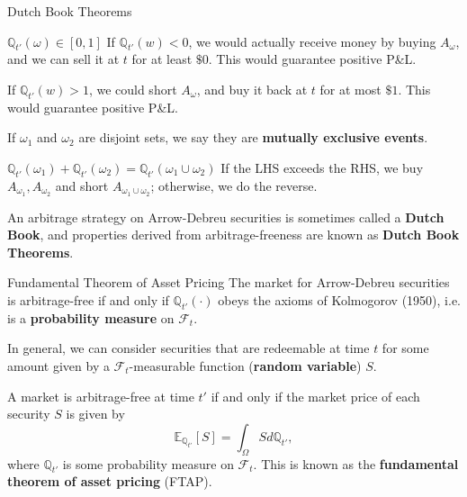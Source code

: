\documentclass{beamer}
\begin{document}
\begin{frame}{Dutch Book Theorems}
	\begin{block}{$\mathbb{Q}_{t'}(\omega) \in [0,1]$}
		If $\mathbb{Q}_{t'}(w)<0$, we would actually receive money by buying $A_\omega$, and we can sell it at $t$ for at least $\$0$. This would guarantee positive P\&L.

		If $\mathbb{Q}_{t'}(w)>1$, we could short $A_\omega$, and buy it back at $t$ for at most $\$1$. This would guarantee positive P\&L.
	\end{block}

	If $\omega_1$ and $\omega_2$ are disjoint sets, we say they are \textbf{mutually exclusive events}.
	\begin{block}{$\mathbb{Q}_{t'}(\omega_1) + \mathbb{Q}_{t'}(\omega_2) = \mathbb{Q}_{t'}(\omega_1 \cup \omega_2)$}
		If the LHS exceeds the RHS, we buy $A_{\omega_1},A_{\omega_2}$ and short $A_{\omega_1\cup\omega_2}$; otherwise, we do the reverse.
	\end{block}

	An arbitrage strategy on Arrow-Debreu securities is sometimes called a \textbf{Dutch Book}, and properties derived from arbitrage-freeness are known as \textbf{Dutch Book Theorems}.

\end{frame}

\begin{frame}{Fundamental Theorem of Asset Pricing}
	The market for Arrow-Debreu securities is arbitrage-free if and only if $\mathbb{Q}_{t'}(\cdot)$ obeys the axioms of Kolmogorov (1950), i.e. is a \textbf{probability measure} on $\mathcal{F}_t$.%

	In general, we can consider securities that are redeemable at time $t$ for some amount given by a $\mathcal{F}_t$-measurable function (\textbf{random variable}) $S$.

	A market is arbitrage-free at time $t'$ if and only if the market price of each security $S$ is given by
	$$\mathbb{E}_{\mathbb{Q}_{t'}}[S] = \int_\Omega S d\mathbb{Q}_{t'},$$
	where $\mathbb{Q}_{t'}$ is some probability measure on $\mathcal{F}_t$. This is known as the \textbf{fundamental theorem of asset pricing} (FTAP).
\end{frame}
\end{document}
